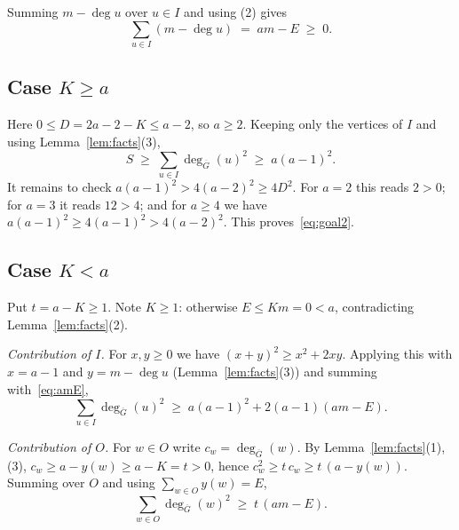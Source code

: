 \documentclass[11pt]{article}
\theoremstyle{definition}
\theoremstyle{remark}
\newcommand{\Gbar}{\overline{G}}
\begin{document}
Summing $m - \deg u$ over $u \in I$ and using (2) gives
\begin{equation}\label{eq:amE}
  \sum_{u \in I} (m - \deg u) \;=\; am - E \;\ge\; 0.
\end{equation}

\subsection{Case \texorpdfstring{$K \ge a$}{K >= a}}

Here $0 \le D = 2a - 2 - K \le a - 2$, so $a \ge 2$. Keeping only the vertices
of $I$ and using Lemma~\ref{lem:facts}(3),
\[
  S \;\ge\; \sum_{u \in I} \deg_{\Gbar}(u)^2 \;\ge\; a(a-1)^2.
\]
It remains to check $a(a-1)^2 > 4(a-2)^2 \ge 4D^2$. For $a = 2$ this reads
$2 > 0$; for $a = 3$ it reads $12 > 4$; and for $a \ge 4$ we have
$a(a-1)^2 \ge 4(a-1)^2 > 4(a-2)^2$. This proves~\eqref{eq:goal2}.

\subsection{Case \texorpdfstring{$K < a$}{K < a}}

Put $t = a - K \ge 1$. Note $K \ge 1$: otherwise $E \le Km = 0 < a$,
contradicting Lemma~\ref{lem:facts}(2).

\emph{Contribution of $I$.} For $x, y \ge 0$ we have
$(x+y)^2 \ge x^2 + 2xy$. Applying this with $x = a-1$ and
$y = m - \deg u$ (Lemma~\ref{lem:facts}(3)) and summing with~\eqref{eq:amE},
\[
  \sum_{u \in I} \deg_{\Gbar}(u)^2
  \;\ge\; a(a-1)^2 + 2(a-1)(am - E).
\]

\emph{Contribution of $O$.} For $w \in O$ write $c_w = \deg_{\Gbar}(w)$. By
Lemma~\ref{lem:facts}(1),(3), $c_w \ge a - y(w) \ge a - K = t > 0$, hence
$c_w^2 \ge t\,c_w \ge t\,(a - y(w))$. Summing over $O$ and using
$\sum_{w \in O} y(w) = E$,
\[
  \sum_{w \in O} \deg_{\Gbar}(w)^2 \;\ge\; t\,(am - E).
\]
\end{document}
